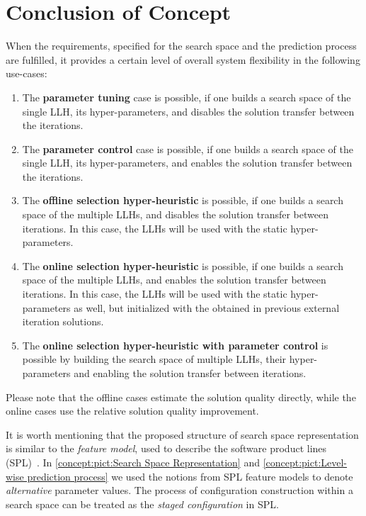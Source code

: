 \section{Conclusion of Concept}\label{concept: conclution}
When the requirements, specified for the search space and the prediction process are fulfilled, it provides a certain level of overall system flexibility in the following use-cases:
\begin{enumerate}
	\item The \textbf{parameter tuning} case is possible, if one builds a search space of the single LLH, its hyper-parameters, and disables the solution transfer between the iterations.
	
	\item The \textbf{parameter control} case is possible, if one builds a search space of the single LLH, its hyper-parameters, and enables the solution transfer between the iterations. 
	
	\item The \textbf{offline selection hyper-heuristic} is possible, if one builds a search space of the multiple LLHs, and disables the solution transfer between iterations. In this case, the LLHs will be used with the static hyper-parameters.
	
	\item The \textbf{online selection hyper-heuristic} is possible, if one builds a search space of the multiple LLHs, and enables the solution transfer between iterations. In this case, the LLHs will be used with the static hyper-parameters as well, but initialized with the obtained in previous external iteration solutions.
	
	\item The \textbf{online selection hyper-heuristic with parameter control} is possible by building the search space of multiple LLHs, their hyper-parameters and enabling the solution transfer between iterations.
\end{enumerate}

Please note that the offline cases estimate the solution quality directly, while the online cases use the relative solution quality improvement.

It is worth mentioning that the proposed structure of search space representation is similar to the \emph{feature model}, used to describe the software product lines (SPL)~\cite{schroeter2012multi}. In \cref{concept:pict:Search Space Representation} and \cref{concept:pict:Level-wise prediction process} we used the notions from SPL feature models to denote \emph{alternative} parameter values. The process of configuration construction within a search space can be treated as the \emph{staged configuration} in SPL.
